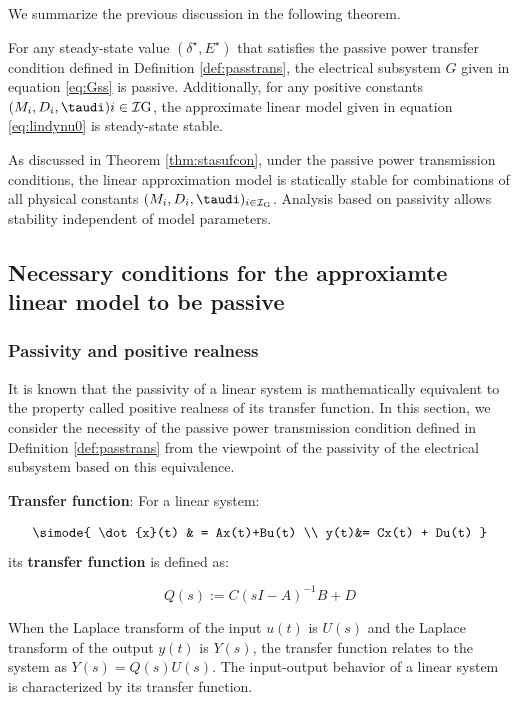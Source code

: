 \documentclass[graybox, envcountchap]{svmult}
\begin{document}
We summarize the previous discussion in the following theorem.

\begin{theorem}\label{thm:stasufcon}
For any steady-state value $(\delta^{\star},E^{\star})$ that satisfies the
passive power transfer condition defined in Definition \ref{def:passtrans}, the
electrical subsystem $G$ given in equation \ref{eq:Gss} is passive.
Additionally, for any positive constants $(M_i,D_i,\taudi ){i \in
\mathcal{I}{\rm G}}$, the approximate linear model given in equation
\ref{eq:lindynu0} is steady-state stable.
\end{theorem}

As discussed in Theorem \ref{thm:stasufcon}, under the passive power
transmission conditions, the linear approximation model is statically stable for
combinations of all physical constants $(M_i,D_i,\taudi )_{i \in
\mathcal{I}_{\rm G}}$.  Analysis based on passivity allows stability independent
of model parameters.

\subsection{Necessary conditions for the approxiamte linear model to be
passive\advanced}\label{sec:nesconana}

\smallskip
\subsubsection{Passivity and positive realness}

It is known that the passivity of a linear system is mathematically equivalent
to the property called positive realness of its transfer function. In this
section, we consider the necessity of the passive power transmission condition
defined in Definition \ref{def:passtrans} from the viewpoint of the passivity of
the electrical subsystem based on this equivalence.

\begin{COLUMN}
\noindent \textbf{Transfer function}:
For a linear system:

\begin{equation*}
  \simode{
    \dot{x}(t) & = Ax(t)+Bu(t) \\
    y(t)&= Cx(t) + Du(t)
  }
\end{equation*}
its \textbf{transfer function} is defined as:

\[
  Q(s):=C(sI-A)^{-1}B +D
\]

When the Laplace transform of the input $u(t)$ is $U(s)$ and the Laplace
transform of the output $y(t)$ is $Y(s)$, the transfer function relates to the
system as $Y(s)=Q(s)U(s)$. The input-output behavior of a linear system is
characterized by its transfer function.
\end{COLUMN}
\end{document}

